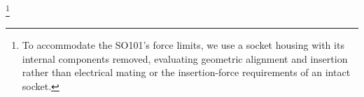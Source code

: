 \footnote{To accommodate the SO101's force limits, we use a socket housing with its internal components removed, evaluating geometric alignment and insertion rather than electrical mating or the insertion-force requirements of an intact socket.}
